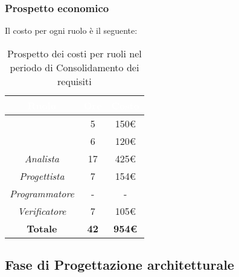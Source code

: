 \subsubsection{Prospetto economico}
Il costo per ogni ruolo è il seguente:
\begin{table}[H]
	\begin{center}
		\begin{tabular}{ |c c c|}
		\rowcolor{darkblue} 
		\textcolor{white}{\textbf{Ruolo}} & \textcolor{white}{\textbf{Ore}} & \textcolor{white}{\textbf{Costo}} \\ \hline
		\textit{\Responsabile} 	& 5 	& 150€ \\ \hline
		\textit{\Amministratore} 	& 6 	& 120€ \\ \hline
		\textit{Analista} 		& 17 	& 425€ \\ \hline
		\textit{Progettista} 	& 7 	& 154€ \\ \hline
		\textit{Programmatore}  	& - 	& - \\ \hline
		\textit{Verificatore} 	& 7 	& 105€ \\ \hline
		\textbf{Totale} & \textbf{42} & \textbf{954€} \\ \hline
		\end{tabular}
	\caption{ Prospetto dei costi per ruoli nel periodo di Consolidamento dei requisiti}
	\end{center}
\end{table}

\subsection{Fase di Progettazione architetturale}
